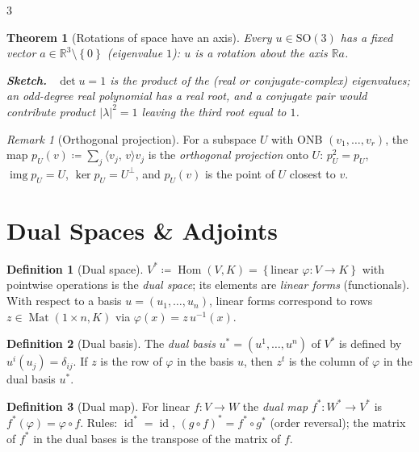 \documentclass[10pt,a4paper,landscape]{article}
\theoremstyle{definition}
\newtheorem{defn}{Definition}[section]
\theoremstyle{plain}
\newtheorem{thm}{Theorem}[section]
\theoremstyle{remark}
\newtheorem{rem}{Remark}[section]
\newcommand{\R}{\mathbb{R}}
\newcommand{\id}{\operatorname{id}}
\newcommand{\abs}[1]{\lvert #1 \rvert}
\newcommand{\set}[1]{\left\{ #1 \right\}}
\newcommand{\deq}{\coloneqq}
\newcommand{\comp}{\circ}
\DeclareMathOperator{\Hom}{Hom}
\DeclareMathOperator{\Mat}{Mat}
\DeclareMathOperator{\img}{img}
\newcommand{\SOn}{\mathrm{SO}}
\newcommand{\ip}[2]{\langle #1,\, #2 \rangle}
\newenvironment{proofsketch}{%
  \par\small\color{exgray}\textbf{Sketch.}\ }%
  {\par}
\begin{document}
\begin{multicols*}{3}
\begin{thm}[Rotations of space have an axis]
Every $u \in \SOn(3)$ has a fixed vector $a \in \R^3 \setminus \set{0}$ (eigenvalue $1$): $u$ is a rotation about the axis $\R a$.
\begin{proofsketch}
$\det u = 1$ is the product of the (real or conjugate-complex) eigenvalues; an odd-degree real polynomial has a real root, and a conjugate pair would contribute product $\abs{\lambda}^2 = 1$ leaving the third root equal to $1$.
\end{proofsketch}
\end{thm}

\begin{rem}[Orthogonal projection]
For a subspace $U$ with ONB $(v_1, \dots, v_r)$, the map $p_U(v) \deq \sum_j \ip{v_j}{v} v_j$ is the \emph{orthogonal projection} onto $U$: $p_U^2 = p_U$, $\img p_U = U$, $\ker p_U = U^{\bot}$, and $p_U(v)$ is the point of $U$ closest to $v$.
\end{rem}

\section{Dual Spaces \& Adjoints}

\begin{defn}[Dual space]
$V^{*} \deq \Hom(V, K) = \set{\text{linear } \varphi: V \to K}$ with pointwise operations is the \emph{dual space}; its elements are \emph{linear forms} (functionals). With respect to a basis $u = (u_1, \dots, u_n)$, linear forms correspond to rows $z \in \Mat(1 \times n, K)$ via $\varphi(x) = z\, u^{-1}(x)$.
\end{defn}

\begin{defn}[Dual basis]
The \emph{dual basis} $u^{*} = (u^{1}, \dots, u^{n})$ of $V^{*}$ is defined by $u^{i}(u_j) = \delta_{ij}$. If $z$ is the row of $\varphi$ in the basis $u$, then $z^t$ is the column of $\varphi$ in the dual basis $u^{*}$.
\end{defn}

\begin{defn}[Dual map]
For linear $f: V \to W$ the \emph{dual map} $f^{*}: W^{*} \to V^{*}$ is $f^{*}(\varphi) = \varphi \comp f$. Rules: $\id^{*} = \id$, $(g \comp f)^{*} = f^{*} \comp g^{*}$ (order reversal); the matrix of $f^{*}$ in the dual bases is the transpose of the matrix of $f$.
\end{defn}


\end{multicols*}
\end{document}
